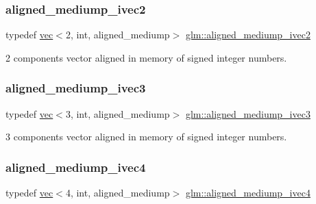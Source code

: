 \subsubsection{\texorpdfstring{aligned\+\_\+mediump\+\_\+ivec2}{aligned\_mediump\_ivec2}}
{\footnotesize\ttfamily typedef \mbox{\hyperlink{structglm_1_1vec}{vec}}$<$2, int, aligned\+\_\+mediump$>$ \mbox{\hyperlink{group__gtc__type__aligned_ga21c35fcb068f6d38f3aaed915c3e3b5a}{glm\+::aligned\+\_\+mediump\+\_\+ivec2}}}



2 components vector aligned in memory of signed integer numbers. 

\mbox{\label{group__gtc__type__aligned_gad835ac79ecdcae8d6292b37656f54973}} 
\subsubsection{\texorpdfstring{aligned\+\_\+mediump\+\_\+ivec3}{aligned\_mediump\_ivec3}}
{\footnotesize\ttfamily typedef \mbox{\hyperlink{structglm_1_1vec}{vec}}$<$3, int, aligned\+\_\+mediump$>$ \mbox{\hyperlink{group__gtc__type__aligned_gad835ac79ecdcae8d6292b37656f54973}{glm\+::aligned\+\_\+mediump\+\_\+ivec3}}}



3 components vector aligned in memory of signed integer numbers. 

\mbox{\label{group__gtc__type__aligned_ga6960abdd6dda1c21b99d28894414ff67}} 
\subsubsection{\texorpdfstring{aligned\+\_\+mediump\+\_\+ivec4}{aligned\_mediump\_ivec4}}
{\footnotesize\ttfamily typedef \mbox{\hyperlink{structglm_1_1vec}{vec}}$<$4, int, aligned\+\_\+mediump$>$ \mbox{\hyperlink{group__gtc__type__aligned_ga6960abdd6dda1c21b99d28894414ff67}{glm\+::aligned\+\_\+mediump\+\_\+ivec4}}}



